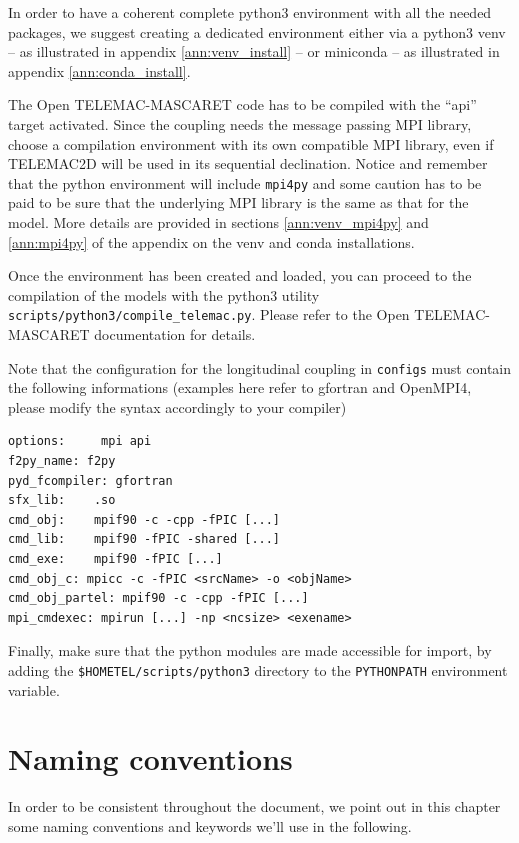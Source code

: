 In order to have a coherent complete python3 environment with all
the needed packages, we suggest creating a
dedicated environment either via a python3 venv -- as illustrated in
appendix \ref{ann:venv_install} -- or miniconda -- as illustrated in
appendix \ref{ann:conda_install}.
\newline

The Open TELEMAC-MASCARET code has to be compiled with the ``api''
target activated. Since the coupling needs the message passing MPI
library, choose a compilation environment with its own compatible MPI
library, even if TELEMAC2D will be used in its sequential
declination. Notice and remember that the python environment will
include \texttt{mpi4py} and some caution has to be paid to be sure
that the underlying MPI library is the same as that for the model. More
details are provided in sections
\ref{ann:venv_mpi4py} and \ref{ann:mpi4py} of the
appendix on the venv and conda installations.
\newline

Once the environment has been created and loaded, you can
proceed to the compilation of the models with the python3 utility
\texttt{scripts/python3/compile\_telemac.py}. Please refer to the Open
TELEMAC-MASCARET documentation for details.

Note that the configuration for the
longitudinal coupling in \texttt{configs} must contain the following
informations (examples here refer to gfortran and OpenMPI4, please
modify the syntax
accordingly to your compiler)
\begin{verbatim}
options:     mpi api
f2py_name: f2py
pyd_fcompiler: gfortran
sfx_lib:    .so
cmd_obj:    mpif90 -c -cpp -fPIC [...]
cmd_lib:    mpif90 -fPIC -shared [...]
cmd_exe:    mpif90 -fPIC [...]
cmd_obj_c: mpicc -c -fPIC <srcName> -o <objName>
cmd_obj_partel: mpif90 -c -cpp -fPIC [...]
mpi_cmdexec: mpirun [...] -np <ncsize> <exename>
\end{verbatim}

Finally, make sure that the python modules are made accessible for
import, by adding the \texttt{\$HOMETEL/scripts/python3} directory to
the \texttt{PYTHONPATH} environment variable.

\chapter{Naming conventions}\label{namcon}
In order to be consistent throughout the document, we point out
in this chapter some naming conventions and keywords we'll use in
the following.

